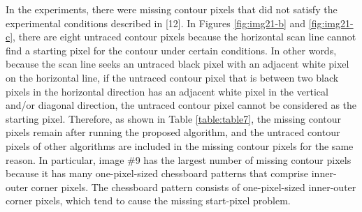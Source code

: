 

In the experiments, there were missing contour pixels that did not satisfy the experimental conditions described in [12]. In Figures \ref{fig:img21-b} and \ref{fig:img21-c}, there are eight untraced contour pixels because the horizontal scan line cannot find a starting pixel for the contour under certain conditions. In other words, because the scan line seeks an untraced black pixel with an adjacent white pixel on the horizontal line, if the untraced contour pixel that is between two black pixels in the horizontal direction has an adjacent white pixel in the vertical and/or diagonal direction, the untraced contour pixel cannot be considered as the starting pixel. Therefore, as shown in Table \ref{table:table7}, the missing contour pixels remain after running the proposed algorithm, and the untraced contour pixels of other algorithms are included in the missing contour pixels for the same reason. In particular, image \#9 has the largest number of missing contour pixels because it has many one-pixel-sized chessboard patterns that comprise inner-outer corner pixels. The chessboard pattern consists of one-pixel-sized inner-outer corner pixels, which tend to cause the missing start-pixel problem. 

